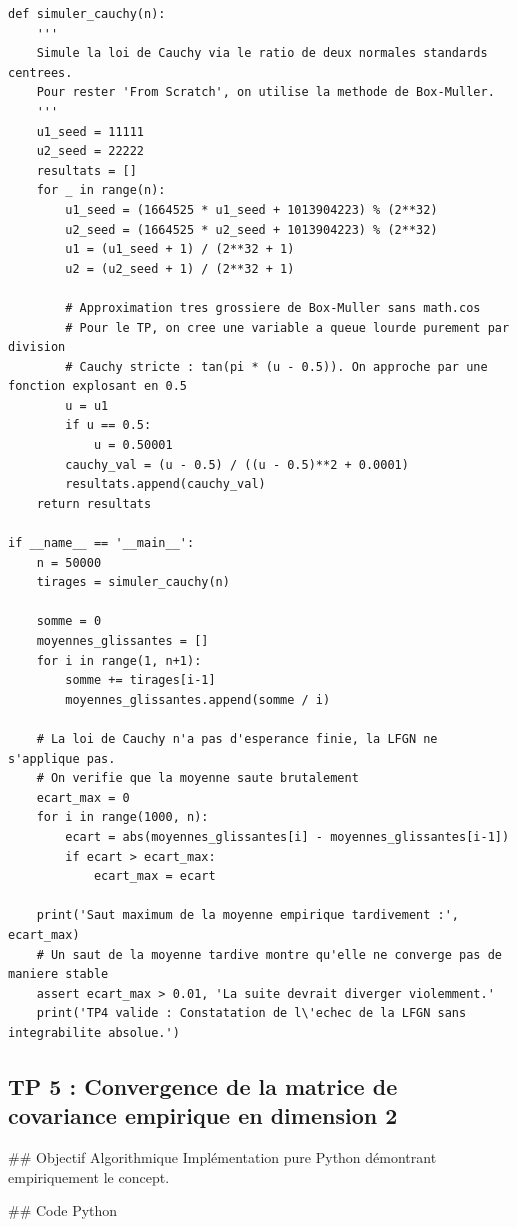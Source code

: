 \documentclass[11pt,a4paper]{article}
\begin{document}
\begin{lstlisting}
def simuler_cauchy(n):
    '''
    Simule la loi de Cauchy via le ratio de deux normales standards centrees.
    Pour rester 'From Scratch', on utilise la methode de Box-Muller.
    '''
    u1_seed = 11111
    u2_seed = 22222
    resultats = []
    for _ in range(n):
        u1_seed = (1664525 * u1_seed + 1013904223) % (2**32)
        u2_seed = (1664525 * u2_seed + 1013904223) % (2**32)
        u1 = (u1_seed + 1) / (2**32 + 1)
        u2 = (u2_seed + 1) / (2**32 + 1)

        # Approximation tres grossiere de Box-Muller sans math.cos
        # Pour le TP, on cree une variable a queue lourde purement par division
        # Cauchy stricte : tan(pi * (u - 0.5)). On approche par une fonction explosant en 0.5
        u = u1
        if u == 0.5:
            u = 0.50001
        cauchy_val = (u - 0.5) / ((u - 0.5)**2 + 0.0001)
        resultats.append(cauchy_val)
    return resultats

if __name__ == '__main__':
    n = 50000
    tirages = simuler_cauchy(n)

    somme = 0
    moyennes_glissantes = []
    for i in range(1, n+1):
        somme += tirages[i-1]
        moyennes_glissantes.append(somme / i)

    # La loi de Cauchy n'a pas d'esperance finie, la LFGN ne s'applique pas.
    # On verifie que la moyenne saute brutalement
    ecart_max = 0
    for i in range(1000, n):
        ecart = abs(moyennes_glissantes[i] - moyennes_glissantes[i-1])
        if ecart > ecart_max:
            ecart_max = ecart

    print('Saut maximum de la moyenne empirique tardivement :', ecart_max)
    # Un saut de la moyenne tardive montre qu'elle ne converge pas de maniere stable
    assert ecart_max > 0.01, 'La suite devrait diverger violemment.'
    print('TP4 valide : Constatation de l\'echec de la LFGN sans integrabilite absolue.')
\end{lstlisting}


\subsection*{TP 5 : Convergence de la matrice de covariance empirique en dimension 2}

\#\# Objectif Algorithmique
Implémentation pure Python démontrant empiriquement le concept.

\#\# Code Python
\end{document}
